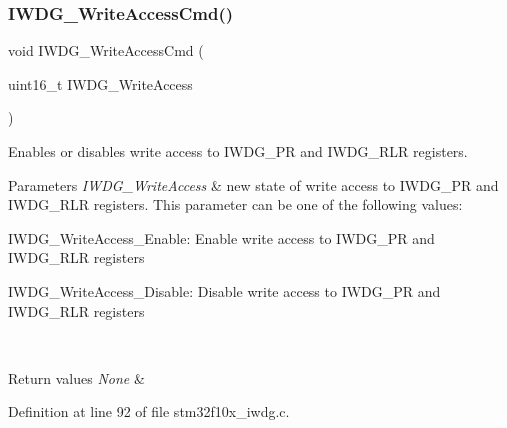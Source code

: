 \subsubsection{\texorpdfstring{I\+W\+D\+G\+\_\+\+Write\+Access\+Cmd()}{IWDG\_WriteAccessCmd()}}
{\footnotesize\ttfamily void I\+W\+D\+G\+\_\+\+Write\+Access\+Cmd (\begin{DoxyParamCaption}\item[{uint16\+\_\+t}]{I\+W\+D\+G\+\_\+\+Write\+Access }\end{DoxyParamCaption})}



Enables or disables write access to I\+W\+D\+G\+\_\+\+PR and I\+W\+D\+G\+\_\+\+R\+LR registers. 


\begin{DoxyParams}{Parameters}
{\em I\+W\+D\+G\+\_\+\+Write\+Access} & new state of write access to I\+W\+D\+G\+\_\+\+PR and I\+W\+D\+G\+\_\+\+R\+LR registers. This parameter can be one of the following values\+: \begin{DoxyItemize}
\item I\+W\+D\+G\+\_\+\+Write\+Access\+\_\+\+Enable\+: Enable write access to I\+W\+D\+G\+\_\+\+PR and I\+W\+D\+G\+\_\+\+R\+LR registers \item I\+W\+D\+G\+\_\+\+Write\+Access\+\_\+\+Disable\+: Disable write access to I\+W\+D\+G\+\_\+\+PR and I\+W\+D\+G\+\_\+\+R\+LR registers \end{DoxyItemize}
\\
\hline
\end{DoxyParams}

\begin{DoxyRetVals}{Return values}
{\em None} & \\
\hline
\end{DoxyRetVals}


Definition at line 92 of file stm32f10x\+\_\+iwdg.\+c.

